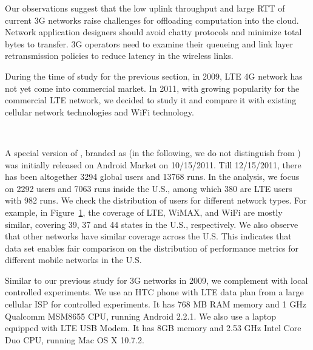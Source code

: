 Our observations suggest that the low uplink throughput and large RTT of current 3G networks raise challenges for offloading computation into the cloud. Network application designers should avoid chatty protocols and minimize total bytes to transfer. 3G operators need to examine their queueing and link layer retransmission policies to reduce latency in the wireless links. 



\label{sec:net.lte}

During the time of study for the previous section, \ie in 2009, LTE 4G network has not yet come into commercial market. In 2011, with growing popularity for the commercial LTE network, we decided to study it and compare it with existing cellular network technologies and WiFi technology.

\begin{figure}[t]
\centering
{} \\
\label{fig:net.gps}
\end{figure}

A special version of \mobiperf, branded as \FT (in the following, we do not distinguish \FT from \mobiperf) was initially released on Android Market on 10/15/2011. Till 12/15/2011, there has been altogether 3294 global users and 13768 runs. In the analysis, we focus on 2292 users and 7063 runs inside the U.S., among which 380 are LTE users with 982 runs. We check the distribution of \mobiperf users for different network types. For example, in Figure~\ref{fig:net.gps}, the coverage of LTE, WiMAX, and WiFi are mostly similar, covering 39, 37 and 44 states in the U.S., respectively. We also observe that other networks have similar coverage across the U.S. This indicates that \mobiperf data set enables fair comparison on the distribution of performance metrics for different mobile networks in the U.S. 

Similar to our previous study for 3G networks in 2009, we complement \mobiperf with local controlled experiments.
We use an HTC phone with LTE data plan from a large cellular ISP for controlled experiments. It has 768 MB RAM memory and 1 GHz Qualcomm MSM8655 CPU, running Android 2.2.1. We also use a laptop equipped with LTE USB Modem. It has 8GB memory and 2.53 GHz Intel Core Duo CPU, running Mac OS X 10.7.2.

\label{sec:net.4gtest}

